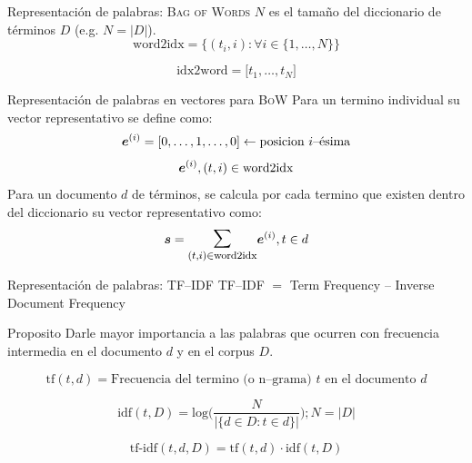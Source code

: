 \documentclass[10pt]{beamer}
\begin{document}
\begin{frame}{Representación de palabras: \textsc{Bag of Words}}
  $N$ es el tamaño del diccionario de términos $D$ (e.g. $N = |D|$).
  \begin{equation*} \label{eq:bow-repr1}
    \text{word2idx} = \Big\{(t_i, i) : \forall i \in \{1, \ldots, N\} \Big\}
  \end{equation*}
  
  \begin{equation*} \label{eq:bow-repr2}
    \text{idx2word} = \Big[t_1, \ldots, t_N\Big]
  \end{equation*}

  \begin{alertblock}{Representación de palabras en vectores para \textsc{BoW}}
    Para un termino individual su vector representativo se define como:
    \begin{equation*}
      {\bm{e}}^{(i)} = [0, \ldots, 1, \ldots, 0] \leftarrow \text{posicion } i\text{--\'esima}
    \end{equation*}
    \begin{equation*}
      {\bm{e}}^{(i)}, (t, i) \in \text{word2idx}
    \end{equation*}
    Para un documento $d$ de términos, se calcula por cada termino que existen dentro del diccionario su vector representativo como:
    \begin{equation*} \label{eq:bow-word-vector-sum}
      \vs = \mathlarger{\mathlarger{\sum}}_{(t, i) \in \text{word2idx}} \ve^{(i)}, t \in d
    \end{equation*}
  \end{alertblock}
\end{frame}

\begin{frame}{Representación de palabras: \textsc{TF--IDF}}
  \textsc{TF--IDF} $=$ Term Frequency -- Inverse Document Frequency
  \begin{alertblock}{Proposito}
    Darle mayor importancia a las palabras que ocurren con frecuencia intermedia en el documento $d$ y en el corpus $D$.
  \end{alertblock}
  \begin{equation*} \label{eq:tf-repr}
    \text{tf}(t,d) = \text{Frecuencia del termino (o n--grama) } t \text{ en el documento } d
  \end{equation*}

  \begin{equation*} \label{eq:idf-repr}
    \text{idf}(t, D) = \text{log}\Bigg( \frac{N}{|\{d \in D : t \in d\}|} \Bigg) ; N = |D|
  \end{equation*}

  \begin{equation*} \label{eq:tfidf-repr}
    \text{tf-idf}(t, d, D) = \text{tf}(t, d) \cdot \text{idf}(t, D)
  \end{equation*}
\end{frame}
\end{document}
